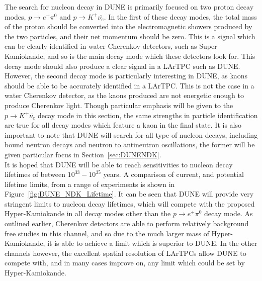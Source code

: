 The search for nucleon decay in DUNE is primarily focused on two proton decay modes, $p \rightarrow e^{+} \pi^{0}$ and $p \rightarrow K^{+} \overline{\nu_{e}}$. In the first of these decay modes, the total mass of the proton should be converted into the electromagnetic showers produced by the two particles, and their net momentum should be zero. This is a signal which can be clearly identified in water Cherenkov detectors, such as Super-Kamiokande, and so is the main decay mode which these detectors look for. This decay mode should also produce a clear signal in a LArTPC such as DUNE. However, the second decay mode is particularly interesting in DUNE, as kaons should be able to be accurately identified in a LArTPC. This is not the case in a water Cherenkov detector, as the kaons produced are not energetic enough to produce Cherenkov light. Though particular emphasis will be given to the $p \rightarrow K^{+} \overline{\nu_{e}}$ decay mode in this section, the same strengths in particle identification are true for all decay modes which feature a kaon in the final state. It is also important to note that DUNE will search for all type of nucleon decays, including bound neutron decays and neutron to antineutron oscillations, the former will be given particular focus in Section~\ref{sec:DUNENDK}. \\

It is hoped that DUNE will be able to reach sensitivities to nucleon decay lifetimes of between $10^{33}-10^{35}$ years. A comparison of current, and potential lifetime limits, from a range of experiments is shown in Figure~\ref{fig:DUNE_NDK_Lifetime}. It can be seen that DUNE will provide very stringent limits to nucleon decay lifetimes, which will compete with the proposed Hyper-Kamiokande in all decay modes other than the $p \rightarrow e^{+} \pi^{0}$ decay mode. As outlined earlier, Cherenkov detectors are able to perform relatively background free studies in this channel, and so due to the much larger mass of Hyper-Kamiokande, it is able to achieve a limit which is superior to DUNE. In the other channels however, the excellent spatial resolution of LArTPCs allow DUNE to compete with, and in many cases improve on, any limit which could be set by Hyper-Kamiokande. \\

